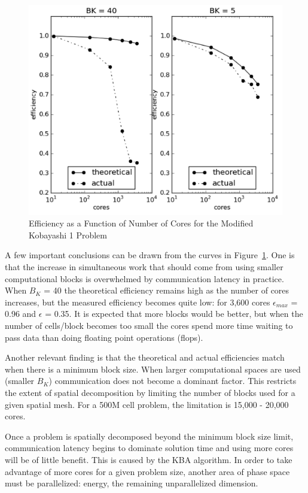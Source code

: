 \begin{figure}[!h]
  \begin{center}
    \includegraphics [width=.9\textwidth, height=0.5\textheight ] {JagBlockStudy}
  \end{center}
  \caption{Efficiency as a Function of Number of Cores for the Modified Kobayashi 1 Problem}
  \label{fig:JagBlockStudy}
\end{figure}

A few important conclusions can be drawn from the curves in Figure~\ref{fig:JagBlockStudy}. One is that the increase in simultaneous work that should come from using smaller computational blocks is overwhelmed by communication latency in practice. When $B_{K}$ = 40 the theoretical efficiency remains high as the number of cores increases, but the measured efficiency becomes quite low: for 3,600 cores $\epsilon_{max}$ = 0.96 and $\epsilon$ = 0.35. It is expected that more blocks would be better, but when the number of cells/block becomes too small the cores spend more time waiting to pass data than doing floating point operations (flops). 

Another relevant finding is that the theoretical and actual efficiencies match when there is a minimum block size. When larger computational spaces are used (smaller $B_{K}$) communication does not become a dominant factor. This restricts the extent of spatial decomposition by limiting the number of blocks used for a given spatial mesh. For a 500M cell problem, the limitation is 15,000 - 20,000 cores. 

Once a problem is spatially decomposed beyond the minimum block size limit, communication latency begins to dominate solution time and using more cores will be of little benefit. This is caused by the KBA algorithm. In order to take advantage of more cores for a given problem size, another area of phase space must be parallelized: energy, the remaining unparallelized dimension. 

